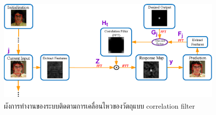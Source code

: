 \begin{figure}[!ht]
	\centering
	\includegraphics[width=1\textwidth]{chapter2/images/correlation_marked.png}
		\caption[ผังการทำงานของระบบติดตามการเคลื่อนไหวของวัตถุแบบ correlation filter]{ผังการทำงานของระบบติดตามการเคลื่อนไหวของวัตถุแบบ correlation filter\textsuperscript{\cite{chen2015experimental}}}
    	\label{fig:correlation_concept}
\end{figure}

